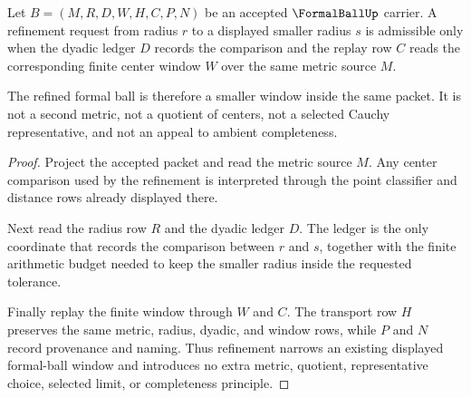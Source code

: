\begin{theorem}
\label{thm:formalball-radius-refinement}
Let $B=(M,R,D,W,H,C,P,N)$ be an accepted $\FormalBallUp$ carrier. A refinement request from radius $r$ to a displayed smaller radius $s$ is admissible only when the dyadic ledger $D$ records the comparison and the replay row $C$ reads the corresponding finite center window $W$ over the same metric source $M$.

The refined formal ball is therefore a smaller window inside the same packet. It is not a second metric, not a quotient of centers, not a selected Cauchy representative, and not an appeal to ambient completeness.
\end{theorem}
\begin{proof}
Project the accepted packet and read the metric source $M$. Any center comparison used by the refinement is interpreted through the point classifier and distance rows already displayed there.

Next read the radius row $R$ and the dyadic ledger $D$. The ledger is the only coordinate that records the comparison between $r$ and $s$, together with the finite arithmetic budget needed to keep the smaller radius inside the requested tolerance.

Finally replay the finite window through $W$ and $C$. The transport row $H$ preserves the same metric, radius, dyadic, and window rows, while $P$ and $N$ record provenance and naming. Thus refinement narrows an existing displayed formal-ball window and introduces no extra metric, quotient, representative choice, selected limit, or completeness principle.
\end{proof}

